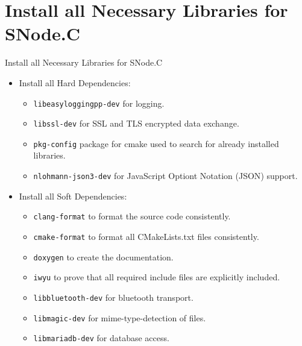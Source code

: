 \section{Install all Necessary Libraries for SNode.C}

\begin{frame}{Install all Necessary Libraries for SNode.C}
  \begin{itemize}
    \item Install all \textcolor{fh-ooe-red}{Hard Dependencies}:
    \begin{itemize}
      \item \texttt{\textcolor{fh-ooe-red}{libeasyloggingpp-dev}} for logging.
      \item \texttt{\textcolor{fh-ooe-red}{libssl-dev}} for SSL and TLS encrypted data exchange.
      \item \texttt{\textcolor{fh-ooe-red}{pkg-config}} package for cmake used to search for already installed libraries.
      \item \texttt{\textcolor{fh-ooe-red}{nlohmann-json3-dev}} for \textcolor{fh-ooe-red}{J}ava\textcolor{fh-ooe-red}{S}cript \textcolor{fh-ooe-red}{O}ptiont \textcolor{fh-ooe-red}{N}otation (\textcolor{fh-ooe-red}{JSON}) support.
    \end{itemize}
    \item Install all \textcolor{fh-ooe-red}{Soft Dependencies}:
    \begin{itemize}
      \item \texttt{\textcolor{fh-ooe-red}{clang-format}} to format the source code consistently.
      \item \texttt{\textcolor{fh-ooe-red}{cmake-format}} to format all CMakeLists.txt files consistently.
      \item \texttt{\textcolor{fh-ooe-red}{doxygen}} to create the documentation.
      \item \texttt{\textcolor{fh-ooe-red}{iwyu}} to prove that all required include files are explicitly included.
      \item \texttt{\textcolor{fh-ooe-red}{libbluetooth-dev}} for bluetooth transport.
      \item \texttt{\textcolor{fh-ooe-red}{libmagic-dev}} for mime-type-detection of files.
      \item \texttt{\textcolor{fh-ooe-red}{libmariadb-dev}} for database access.
    \end{itemize}
  \end{itemize}
\end{frame}
